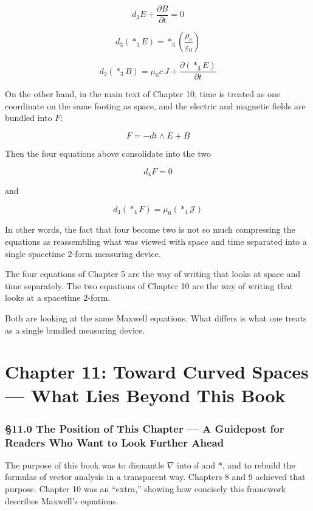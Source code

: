 \[
d_3E+\frac{\partial B}{\partial t}=0
\]

\[
d_3(\ast_3E)=\ast_3\left(\frac{\rho_{\mathrm e}}{\varepsilon_0}\right)
\]

\[
d_3(\ast_3B)=\mu_0 c\,J+\frac{\partial(\ast_3E)}{\partial t}
\]

On the other hand, in the main text of Chapter 10, time is treated as
one coordinate on the same footing as space, and the electric and
magnetic fields are bundled into \(F\):

\[
F=-dt\wedge E+B
\]

Then the four equations above consolidate into the two

\[
d_4F=0
\]

and

\[
d_4(\ast_4F)=\mu_0(\ast_4\mathcal J)
\]

In other words, the fact that four become two is not so much compressing
the equations as reassembling what was viewed with space and time
separated into a single spacetime \(2\)-form measuring device.

The four equations of Chapter 5 are the way of writing that looks at
space and time separately. The two equations of Chapter 10 are the way
of writing that looks at a spacetime \(2\)-form.

Both are looking at the same Maxwell equations. What differs is what one
treats as a single bundled measuring device.

\newpage

\hypertarget{chapter-11-toward-curved-spaces-what-lies-beyond-this-book}{%
\chapter{Chapter 11: Toward Curved Spaces --- What Lies Beyond This
Book}\label{chapter-11-toward-curved-spaces-what-lies-beyond-this-book}}

\hypertarget{the-position-of-this-chapter-a-guidepost-for-readers-who-want-to-look-further-ahead}{%
\subsection{§11.0 The Position of This Chapter --- A Guidepost for
Readers Who Want to Look Further
Ahead}\label{the-position-of-this-chapter-a-guidepost-for-readers-who-want-to-look-further-ahead}}

The purpose of this book was to dismantle \(\nabla\) into \(d\) and
\(\ast\), and to rebuild the formulas of vector analysis in a
transparent way. Chapters 8 and 9 achieved that purpose. Chapter 10 was
an ``extra,'' showing how concisely this framework describes Maxwell's
equations.

